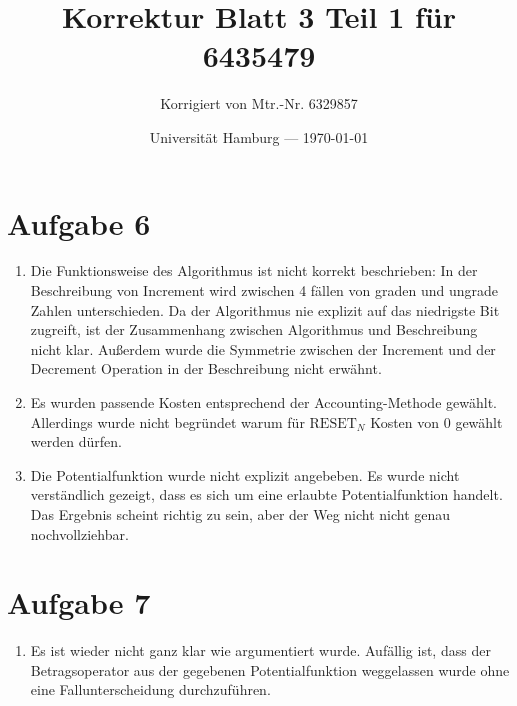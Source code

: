 \documentclass[parskip=half,a4paper]{scrartcl}
\title{Korrektur Blatt 3 Teil 1 für 6435479}
\author{Korrigiert von Mtr.-Nr. 6329857}
\date{Universität Hamburg --- \today}
\begin{document}
\maketitle %

\section*{Aufgabe 6}

\begin{enumerate}
    \item Die Funktionsweise des Algorithmus ist nicht korrekt beschrieben: In der Beschreibung von Increment wird zwischen 4 fällen von graden und ungrade Zahlen unterschieden. Da der Algorithmus nie explizit auf das niedrigste Bit zugreift, ist der Zusammenhang zwischen Algorithmus und Beschreibung nicht klar. Außerdem wurde die Symmetrie zwischen der Increment und der Decrement Operation in der Beschreibung nicht erwähnt.

    \item Es wurden passende Kosten entsprechend der Accounting-Methode gewählt. Allerdings wurde nicht begründet warum für $\text{RESET}_N$ Kosten von $0$ gewählt werden dürfen.

    \item Die Potentialfunktion wurde nicht explizit angebeben. Es wurde nicht verständlich gezeigt, dass es sich um eine erlaubte Potentialfunktion handelt. Das Ergebnis scheint richtig zu sein, aber der Weg nicht nicht genau nochvollziehbar.
\end{enumerate}

\section*{Aufgabe 7}

\begin{enumerate}
    \item Es ist wieder nicht ganz klar wie argumentiert wurde. Aufällig ist, dass der Betragsoperator aus der gegebenen Potentialfunktion weggelassen wurde ohne eine Fallunterscheidung durchzuführen.
\end{enumerate}
\end{document}

